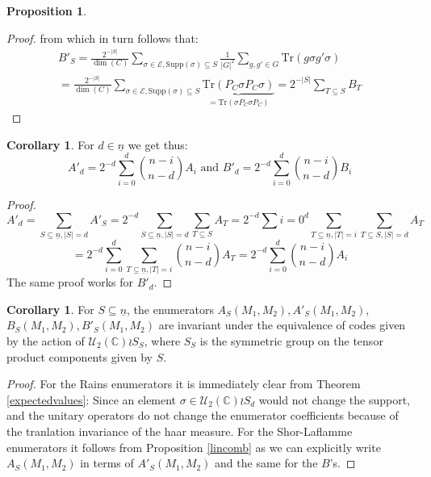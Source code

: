\documentclass[12pt,a4paper,BCOR15mm,twoside,DIV12]{article}
\def\E{\mathcal{E}}
\def\C{\mathbb{C}}
\def\U{\mathcal{U}}
\def\supp{\text{Supp}}
\def\n{\underline{n}}
\def\Tr{\text{Tr}}
\newenvironment{bew}{\begin{proof}[Proof]}{\end{proof}}
\theoremstyle{definition}
\newtheorem{cor}[Satz]{Corollary}
\newtheorem{prop}[Satz]{Proposition}
\begin{document}
\begin{prop}
\begin{bew}
from which in turn follows that:
\begin{align*} B'_S = \frac{2^{-|S|}}{\dim (C)} \sum_{\sigma \in \E, \supp(\sigma) \subseteq S} \frac{1}{|G|^2} \sum_{g,g' \in G} \Tr(g \sigma g' \sigma) \\ = \frac{2^{-|S|}}{\dim (C)} \sum_{\sigma \in \E, \supp(\sigma) \subseteq S } \underbrace{\Tr( P_C \sigma P_C \sigma)}_{=\Tr(\sigma P_C \sigma P_C)} = 2^{-|S|} \sum_{T \subseteq S} B_T \end{align*}
\end{bew}
\end{prop}

\begin{cor}\label{corlincomb}
For $d \in \n$ we get thus: \begin{equation} A'_d = 2^{-d} \sum_{i=0}^d \binom{n-i}{n-d} A_i \text{  and   } B'_d = 2^{-d} \sum_{i=0}^d \binom{n-i}{n-d} B_i \end{equation}
\begin{bew}
\begin{equation}  A'_d = \sum_{S \subseteq \n, |S| = d} A'_S = 2^{-d} \sum_{S \subseteq \n, |S| = d} \sum_{T \subseteq S} A_T  = 2^{-d} \sum{i=0}^d \sum_{T \subseteq \n, |T| = i} \sum_{T \subseteq S, |S| = d} A_T \end{equation}
 \begin{equation} = 2^{-d} \sum_{i=0}^d \sum_{T \subseteq \n, |T| = i} \binom{n-i}{n-d}A_T = 2^{-d} \sum_{i=0}^d \binom{n-i}{n-d} A_i \end{equation}
The same proof works for $B'_d$.
\end{bew}
\end{cor}

\begin{cor}
For $S \subseteq \n$, the enumerators $A_S(M_1,M_2), A'_S(M_1,M_2)$, \\ $B_S(M_1,M_2), B'_S(M_1,M_2)$ are invariant under the equivalence of codes given by the action of $ \U_2(\C) \wr S_S$, where $S_S$ is the symmetric group on the tensor product components given by $S$.
\begin{bew}
For the Rains enumerators it is immediately clear from Theorem \ref{expectedvalues}: Since an element $\sigma \in \U_2(\C) \wr S_d$ would not change the support, and the unitary operators do not change the enumerator coefficients because of the tranlation invariance of the haar measure.
For the Shor-Laflamme enumerators it follows from Proposition \ref{lincomb} as we can explicitly write $A_S(M_1,M_2)$ in terms of $A'_S(M_1,M_2)$ and the same for the $B$'s.
\end{bew}
\end{cor}
\end{document}
